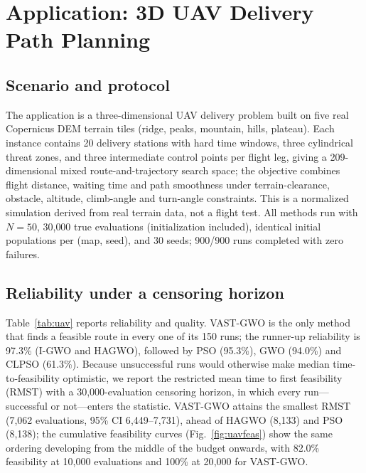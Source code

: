 \documentclass[journal]{IEEEtran}
\newcommand{\method}{VAST-GWO}
\begin{document}
\section{Application: 3D UAV Delivery Path Planning}
\subsection{Scenario and protocol}
The application is a three-dimensional UAV delivery problem built on five
real Copernicus DEM terrain tiles (ridge, peaks, mountain, hills, plateau).
Each instance contains 20 delivery stations with hard time windows, three
cylindrical threat zones, and three intermediate control points per flight
leg, giving a 209-dimensional mixed route-and-trajectory search space; the
objective combines flight distance, waiting time and path smoothness under
terrain-clearance, obstacle, altitude, climb-angle and turn-angle
constraints. This is a normalized simulation derived from real terrain data,
not a flight test. All methods run with $N=50$, 30{,}000 true evaluations
(initialization included), identical initial populations per (map, seed), and
30 seeds; 900/900 runs completed with zero failures.

\subsection{Reliability under a censoring horizon}
Table~\ref{tab:uav} reports reliability and quality. \method{} is the only
method that finds a feasible route in every one of its 150 runs; the runner-up
reliability is 97.3\% (I-GWO and HAGWO), followed by PSO (95.3\%), GWO
(94.0\%) and CLPSO (61.3\%). Because unsuccessful runs would otherwise make
median time-to-feasibility optimistic, we report the restricted mean time to
first feasibility (RMST) with a 30{,}000-evaluation censoring horizon, in
which every run---successful or not---enters the statistic. \method{} attains
the smallest RMST (7{,}062 evaluations, 95\% CI 6{,}449--7{,}731), ahead of
HAGWO (8{,}133) and PSO (8{,}138); the cumulative feasibility curves
(Fig.~\ref{fig:uavfeas}) show the same ordering developing from the middle of
the budget onwards, with 82.0\% feasibility at 10{,}000 evaluations and
100\% at 20{,}000 for \method{}.
\end{document}
